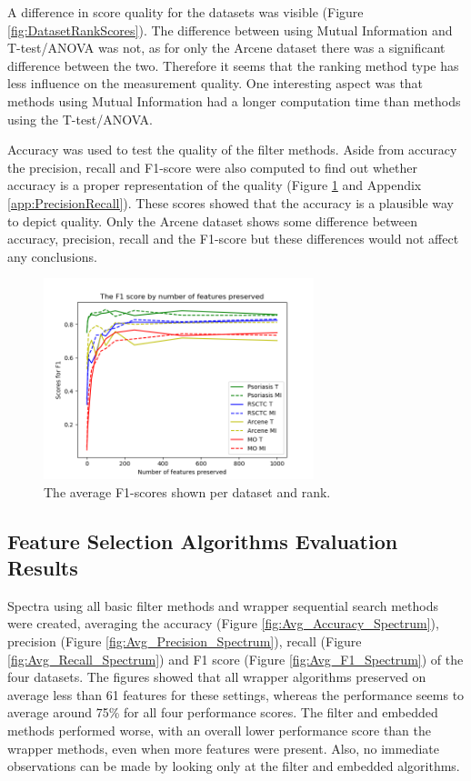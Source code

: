 	A difference in score quality for the datasets was visible (Figure \ref{fig:DatasetRankScores}). The difference between using Mutual Information and T-test/ANOVA was not, as for only the Arcene dataset there was a significant difference between the two. Therefore it seems that the ranking method type has less influence on the measurement quality. One interesting aspect was that methods using Mutual Information had a longer computation time than methods using the T-test/ANOVA.
	
	Accuracy was used to test the quality of the filter methods. Aside from accuracy the precision, recall and F1-score were also computed to find out whether accuracy is a proper representation of the quality (Figure \ref{fig:DatasetRankF1Scores} and Appendix \ref{app:PrecisionRecall}). These scores showed that the accuracy is a plausible way to depict quality. Only the Arcene dataset shows some difference between accuracy, precision, recall and the F1-score but these differences would not affect any conclusions.
	
	\begin{figure}[H]
		\includegraphics[width=0.7\textwidth]{Data_Rank_F1_Scores.png}
		\caption{The average F1-scores shown per dataset and rank.}
		\label{fig:DatasetRankF1Scores}
	\end{figure}
	
	\subsection{Feature Selection Algorithms Evaluation Results}
	\label{subsec:FeatureSelectionAlgorithmsEvaluationResults}
	
	Spectra using all basic filter methods and wrapper sequential search methods were created, averaging the accuracy (Figure \ref{fig:Avg_Accuracy_Spectrum}), precision (Figure \ref{fig:Avg_Precision_Spectrum}), recall (Figure \ref{fig:Avg_Recall_Spectrum}) and F1 score (Figure \ref{fig:Avg_F1_Spectrum}) of the four datasets. The figures showed that all wrapper algorithms preserved on average less than 61 features for these settings, whereas the performance seems to average around 75\% for all four performance scores. The filter and embedded methods performed worse, with an overall lower performance score than the wrapper methods, even when more features were present. Also, no immediate observations can be made by looking only at the filter and embedded algorithms.
	
